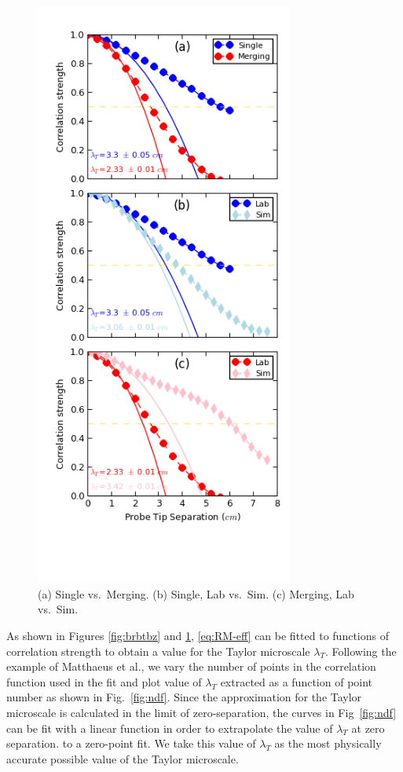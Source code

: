 \documentclass[aip,prl,amsmath,amssymb,reprint,superscriptaddress]{revtex4-1} %
\begin{document}
\begin{figure}[!htbp]
\centering
\includegraphics[width=8.5cm]{Images/comparisons.png}
\caption{\label{fig:comparisons} (a) Single vs.\ Merging. (b) Single, Lab vs.\ Sim. (c) Merging, Lab vs.\ Sim.}
\end{figure}

As shown in Figures \ref{fig:brbtbz} and \ref{fig:comparisons}, \eqref{eq:RM-eff} can be fitted to functions of correlation strength to obtain a value for the Taylor microscale $\lambda_T$. 
Following the example of Matthaeus et al.\cite{Matthaeus05}, we vary the number of points in the correlation function used in the fit and plot value of $\lambda_{T}$ extracted as a function of point number as shown in Fig.~\ref{fig:ndf}. Since the approximation for the Taylor microscale is calculated in the limit of zero-separation, the curves in Fig~\ref{fig:ndf} can be fit with a linear function in order to extrapolate the value of $\lambda_{T}$ at zero separation. to a zero-point fit. We take this value of $\lambda_{T}$ as the most physically accurate possible value of the Taylor microscale.
\end{document}
